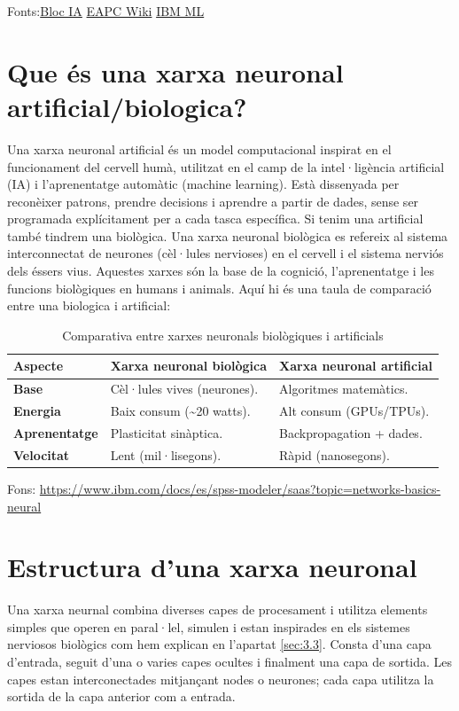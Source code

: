 Fonts:\href{https://blogs.uoc.edu/digitapia/the-european-unions-artificial-intelligence-act-explained/}{Bloc IA} \href{https://formaciooberta.eapc.gencat.cat/contingutsdelscursos/tdp/080_int_artificial/inici.html}{EAPC Wiki}
\href{https://www.ibm.com/think/topics/machine-learning}{IBM ML}

\section{Que és una xarxa neuronal artificial/biologica?}\label{sec:xarxa neuronal}
Una xarxa neuronal artificial és un model computacional inspirat en el funcionament del cervell humà, utilitzat en el camp de la intel·ligència artificial (IA) i l'aprenentatge automàtic (machine learning). Està dissenyada per reconèixer patrons, prendre decisions i aprendre a partir de dades, sense ser programada explícitament per a cada tasca específica.
Si tenim una artificial també tindrem una biològica. Una xarxa neuronal biològica es refereix al sistema interconnectat de neurones (cèl·lules nervioses) en el cervell i el sistema nerviós dels éssers vius. Aquestes xarxes són la base de la cognició, l'aprenentatge i les funcions biològiques en humans i animals.
Aquí hi és una taula de comparació entre una biologica i artificial:

\begin{table}[h!]
\begin{tabular}{|l|l|l|}
\hline
\textbf{Aspecte} & \textbf{Xarxa neuronal biològica} & \textbf{Xarxa neuronal artificial} \\ \hline
\textbf{Base} & Cèl·lules vives (neurones). & Algoritmes matemàtics. \\ \hline
\textbf{Energia} & Baix consum (\textasciitilde20 watts). & Alt consum (GPUs/TPUs). \\ \hline
\textbf{Aprenentatge} & Plasticitat sinàptica. & Backpropagation + dades. \\ \hline
\textbf{Velocitat} & Lent (mil·lisegons). & Ràpid (nanosegons). \\ \hline
\end{tabular}
\caption{Comparativa entre xarxes neuronals biològiques i artificials}
\end{table}
Fons: \href{https://www.ibm.com/docs/es/spss-modeler/saas?topic=networks-basics-neural}{https://www.ibm.com/docs/es/spss-modeler/saas?topic=networks-basics-neural}
\section{Estructura d'una xarxa neuronal}
Una xarxa neurnal combina diverses capes de procesament i utilitza elements simples que operen en paral·lel, simulen i estan inspirades en els sistemes nerviosos biològics com hem explican en l'apartat \ref{sec:3.3}. Consta d'una capa d'entrada, seguit d'una o varies capes ocultes i finalment una capa de sortida. Les capes estan interconectades mitjançant nodes o neurones; cada capa utilitza la sortida de la capa anterior com a entrada.

